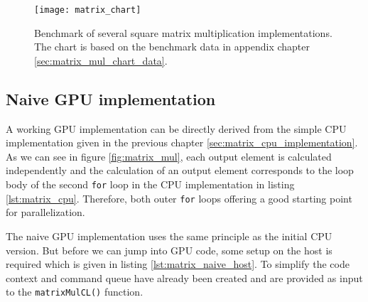 \begin{figure}
	\centering
	\texttt{[image: matrix\_chart]}
	\caption{Benchmark of several square matrix multiplication implementations. The chart is based on the benchmark data in appendix chapter \ref{sec:matrix_mul_chart_data}.}
	\label{fig:matrix_chart}
\end{figure}

\subsection{Naive GPU implementation}
\label{sec:matrix_mul_naive}

A working GPU implementation can be directly derived from the simple CPU implementation given in the previous chapter \ref{sec:matrix_cpu_implementation}. As we can see in figure \ref{fig:matrix_mul}, each output element is calculated independently and the calculation of an output element corresponds to the loop body of the second \lstinline!for! loop in the CPU implementation in listing \ref{lst:matrix_cpu}. Therefore, both outer \lstinline!for! loops offering a good starting point for parallelization. 

The naive GPU implementation uses the same principle as the initial CPU version. But before we can jump into GPU code, some setup on the host is required which is given in listing \ref{lst:matrix_naive_host}. To simplify the code context and command queue have already been created and are provided as input to the \lstinline!matrixMulCL()! function.



